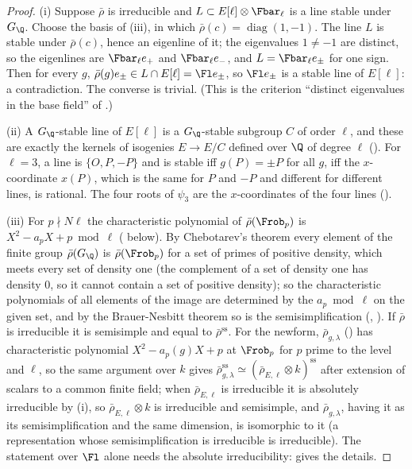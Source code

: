 \begin{proof}
(i) Suppose $\bar\rho$ is irreducible and $L\subset E[\ell]\otimes\Fbar_\ell$ is a line stable under $G_\Q$. Choose the basis of
(iii), in which $\bar\rho(c)=\operatorname{diag}(1,-1)$. The line $L$ is stable under $\bar\rho(c)$, hence an eigenline of it;
the eigenvalues $1\ne-1$ are distinct, so the eigenlines are $\Fbar_\ell e_+$ and $\Fbar_\ell e_-$, and $L=\Fbar_\ell e_\pm$ for one sign. Then for every $g$,
$\bar\rho(g)e_\pm\in L\cap E[\ell]=\Fl e_\pm$, so $\Fl e_\pm$ is a stable line of $E[\ell]$: a contradiction. The converse is trivial. (This is the
criterion ``distinct eigenvalues in the base field'' of .)

(ii) A $G_\Q$-stable line of $E[\ell]$ is a $G_\Q$-stable subgroup $C$ of order $\ell$, and these are exactly the kernels of isogenies $E\to E/C$
defined over $\Q$ of degree $\ell$ (). For $\ell=3$, a line is $\{O,P,-P\}$ and is stable iff $g(P)=\pm P$ for all $g$, iff the
$x$-coordinate $x(P)$, which is the same for $P$ and $-P$ and different for different lines, is rational. The four roots of $\psi_3$ are the
$x$-coordinates of the four lines ().

(iii) For $p\nmid N\ell$ the characteristic polynomial of $\bar\rho(\Frob_p)$ is $X^2-a_pX+p\bmod\ell$ ( below). By
Chebotarev's theorem every element of the finite group $\bar\rho(G_\Q)$ is $\bar\rho(\Frob_p)$ for a set of primes of positive density, which meets every
set of density one (the complement of a set of density one has density $0$, so it cannot contain a set of positive density); so the characteristic polynomials of all elements of the image are determined by the $a_p\bmod\ell$ on the given set,
and by the Brauer-Nesbitt theorem so is the semisimplification (, ). If $\bar\rho$ is irreducible it is
semisimple and equal to $\bar\rho^{\mathrm{ss}}$. For the newform, $\bar\rho_{g,\lambda}$ () has characteristic polynomial $X^2-a_p(g)X+p$ at
$\Frob_p$ for $p$ prime to the level and $\ell$, so the same argument over $k$ gives $\bar\rho_{g,\lambda}^{\mathrm{ss}}\simeq(\bar\rho_{E,\ell}\otimes k)^{\mathrm{ss}}$
after extension of scalars to a common finite field; when $\bar\rho_{E,\ell}$ is irreducible it is absolutely irreducible by (i), so
$\bar\rho_{E,\ell}\otimes k$ is irreducible and semisimple, and $\bar\rho_{g,\lambda}$, having it as its semisimplification and the same dimension, is isomorphic
to it (a representation whose semisimplification is irreducible is irreducible). The statement over $\Fl$ alone needs the absolute
irreducibility:  gives the details.
\end{proof}

